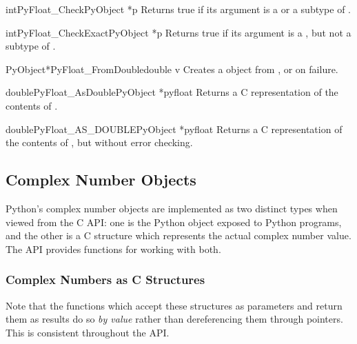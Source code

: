\begin{cfuncdesc}{int}{PyFloat_Check}{PyObject *p}
  Returns true if its argument is a  or a subtype
  of .
\end{cfuncdesc}

\begin{cfuncdesc}{int}{PyFloat_CheckExact}{PyObject *p}
  Returns true if its argument is a , but not a
  subtype of .
\end{cfuncdesc}

\begin{cfuncdesc}{PyObject*}{PyFloat_FromDouble}{double v}
  Creates a  object from , or \NULL{} on
  failure.
\end{cfuncdesc}

\begin{cfuncdesc}{double}{PyFloat_AsDouble}{PyObject *pyfloat}
  Returns a C  representation of the contents of
  .
\end{cfuncdesc}

\begin{cfuncdesc}{double}{PyFloat_AS_DOUBLE}{PyObject *pyfloat}
  Returns a C  representation of the contents of
  , but without error checking.
\end{cfuncdesc}


\subsection{Complex Number Objects \label{complexObjects}}

Python's complex number objects are implemented as two distinct types
when viewed from the C API:  one is the Python object exposed to
Python programs, and the other is a C structure which represents the
actual complex number value.  The API provides functions for working
with both.

\subsubsection{Complex Numbers as C Structures}

Note that the functions which accept these structures as parameters
and return them as results do so \emph{by value} rather than
dereferencing them through pointers.  This is consistent throughout
the API.

